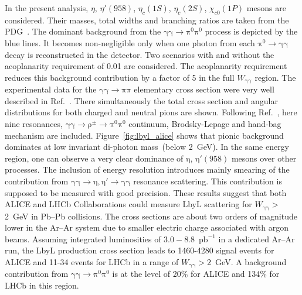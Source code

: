 In the present analysis, $\eta$, $\eta'(958)$, $\eta_c(1S)$, $\eta_c(2S)$, $\chi_{c0}(1P)$ mesons are considered.
Their masses, total widths and branching ratios are taken from the PDG~\cite{Patrignani:2016xqp}.
The dominant background from the $\mathrm{\gamma\gamma\to\pi^0\pi^0}$
process is depicted by the blue lines. It becomes non-negligible only when one photon from each $\mathrm{\pi^0\to\gamma\gamma}$ decay is reconstructed in the detector. Two scenarios with and without the acoplanarity requirement of 0.01 are considered. The acoplanarity requirement reduces this background contribution by a factor of 5 in the full $W_{\mathrm{\gamma\gamma}}$ region.
The experimental data for the $\mathrm{\gamma\gamma\to\pi\pi}$ elementary cross section were very well described in Ref.~\cite{Klusek-Gawenda:2013rtu}.
There simultaneously the total cross section and angular distributions for both charged and neutral pions are shown.
Following Ref.~\cite{Klusek-Gawenda:2013rtu}, here nine resonances,
$\mathrm{\gamma\gamma\to\rho^\pm\to\pi^0\pi^0}$ continuum, Brodsky-Lepage and hand-bag mechanism are included. Figure~\ref{fig:lbyl_alice} shows that pionic background dominates at low invariant di-photon mass~(below 2~GeV).
In the same energy region, one can observe a very clear dominance of
$\mathrm{\eta}$, $\mathrm{\eta'(958)}$ mesons over other processes.
The inclusion of energy resolution introduces mainly smearing of the contribution from
$\mathrm{\gamma\gamma\to\eta,\eta'\to\gamma\gamma}$ resonance scattering.
This contribution is supposed to be measured with good precision.
These results suggest that both ALICE and LHCb Collaborations could measure LbyL scattering for $W_{\mathrm{\gamma\gamma}}>$ 2~GeV in Pb--Pb collisions. The cross sections are about two orders of magnitude lower in the Ar--Ar system due to smaller electric charge associated with argon beams. Assuming integrated luminosities of $3.0-8.8$~$\mathrm{pb^{-1}}$ in a dedicated Ar--Ar run, the LbyL production cross section leads to 1460-4280 signal events for ALICE and 11-34 events for LHCb in a range of $W_{\mathrm{\gamma\gamma}}>2$~GeV. A background contribution from $\mathrm{\gamma\gamma\to\pi^0\pi^0}$ is at the level of 20\% for ALICE and 134\% for LHCb in this region.


